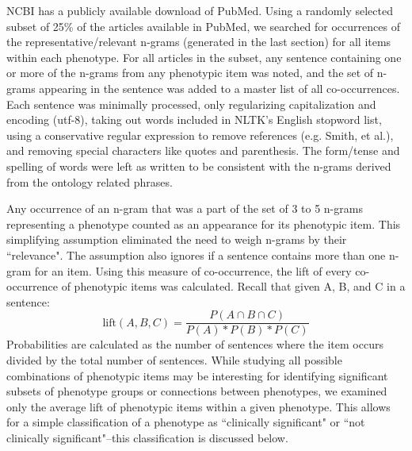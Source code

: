 \documentclass{sig-alternate-05-2015}
\newcommand{\kibitz}[2]{\ifnum\Comments=1\textcolor{#1}{#2}\fi}
\newcommand{\joyce}[1]{\kibitz{purple}      {[Joyce: #1]}}
\newcommand{\jette}[1]{\kibitz{red}      {[Jette: #1]}}
\begin{document}
NCBI has a publicly available download of PubMed.
Using a randomly selected subset of 25\% of the articles available in PubMed, we searched for occurrences of the representative/relevant n-grams (generated in the last section) for all items within each phenotype.
For all articles in the subset, any sentence containing one or more of the n-grams from any phenotypic item was noted, and the set of n-grams appearing in the sentence was added to a master list of all co-occurrences. 
Each sentence was minimally processed, only regularizing capitalization and encoding (utf-8), taking out words included in NLTK's English stopword list, using a conservative regular expression to remove references (e.g. Smith, et al.), and removing special characters like quotes and parenthesis. %
The form/tense and spelling of words were left as written to be consistent with the n-grams derived from the ontology related phrases.

Any occurrence of an n-gram that was a part of the set of 3 to 5 n-grams representing a phenotype counted as an appearance for its phenotypic item.
This simplifying assumption eliminated the need to weigh n-grams by their ``relevance".
The assumption also ignores if a sentence contains more than one n-gram for an item.
Using this measure of co-occurrence, the lift of every co-occurrence of phenotypic items was calculated. Recall that given A, B, and C in a sentence:
$$ \text{lift}(A,B,C) = \frac {P(A \cap B \cap C)} {P(A)*P(B)*P(C)}  $$
Probabilities are calculated as the number of sentences where the item occurs divided by the total number of sentences.
While studying all possible combinations of phenotypic items may be interesting for identifying significant subsets of phenotype groups or connections between phenotypes, we examined only the average lift of phenotypic items within a given phenotype.
This allows for a simple classification of a phenotype as ``clinically significant" or ``not clinically significant"--this classification is discussed below.%
\end{document}
